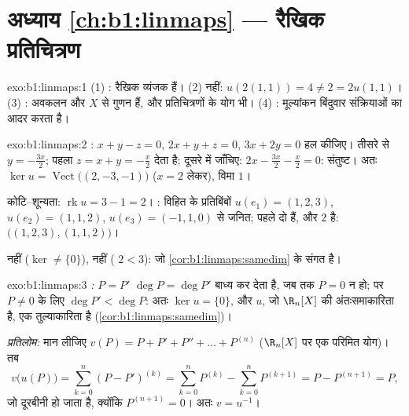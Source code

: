 \section*{अध्याय \ref{ch:b1:linmaps} --- रैखिक प्रतिचित्रण}

\begin{solution}{exo:b1:linmaps:1}
(1) :  रैखिक व्यंजक हैं। (2)  नहीं: $u(2(1,1)) = 4 \neq
2 = 2u(1,1)$। (3) : अवकलन और $X$ से गुणन  हैं, और 
प्रतिचित्रणों के योग भी। (4) : मूल्यांकन बिंदुवार संक्रियाओं का आदर
करता है।
\end{solution}

\begin{solution}{exo:b1:linmaps:2}
: $x + y - z = 0$, $2x + y + z = 0$, $3x + 2y = 0$ हल कीजिए। तीसरे से
$y = -\frac{3x}{2}$; पहला $z = x + y = -\frac x2$ देता है; दूसरे में जाँचिए:
$2x - \frac{3x}{2} - \frac x2 = 0$: संतुष्ट। अतः $\ker u =
\operatorname{Vect}\bigl((2, -3, -1)\bigr)$ ($x = 2$ लेकर), विमा $1$।

कोटि--शून्यता: $\operatorname{rk} u = 3 - 1 = 2$। : विहित  के
प्रतिबिंबों $u(e_1) = (1,2,3)$, $u(e_2) = (1,1,2)$, $u(e_3) = (-1,1,0)$ से
जनित; पहले दो  हैं, और  $2$ है:  $\bigl((1,2,3),
(1,1,2)\bigr)$।

 नहीं ($\ker \neq \{0\}$),  नहीं ( $2 < 3$): जो
\cref{cor:b1:linmaps:samedim} के संगत है।
\end{solution}

\begin{solution}{exo:b1:linmaps:3}
\emph{:} $P = P'$ $\deg P = \deg P'$ बाध्य कर देता है, जब तक $P = 0$ न
हो; पर $P \neq 0$ के लिए $\deg P' < \deg P$: अतः $\ker u = \{0\}$, और $u$,
जो  $\R_n[X]$ की  अंतःसमाकारिता है, एक तुल्याकारिता है
(\cref{cor:b1:linmaps:samedim})।

\emph{प्रतिलोम:} मान लीजिए $v(P) = P + P' + P'' + \dots + P^{(n)}$
($\R_n[X]$ पर एक परिमित योग)। तब
\[
v\bigl(u(P)\bigr) = \sum_{k=0}^{n} (P - P')^{(k)}
= \sum_{k=0}^{n} P^{(k)} - \sum_{k=0}^{n} P^{(k+1)}
= P - P^{(n+1)} = P ,
\]
जो दूरबीनी हो जाता है, क्योंकि $P^{(n+1)} = 0$। अतः $v = u^{-1}$।
\end{solution}

